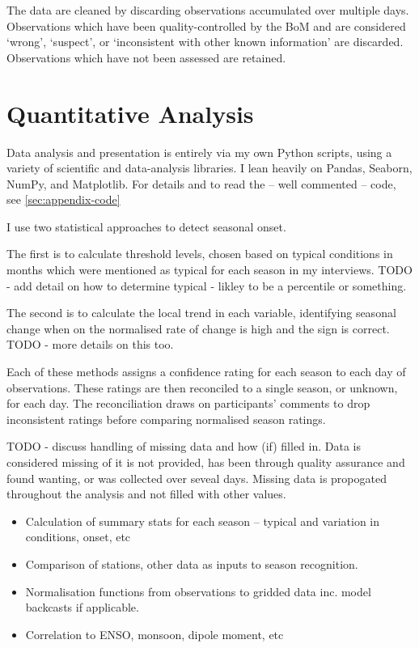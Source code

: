 The data are cleaned by discarding observations accumulated over multiple days.
Observations which have been quality-controlled by the BoM and are considered
`wrong', `suspect', or `inconsistent with other known information' are discarded.
Observations which have not been assessed are retained.



\section{Quantitative Analysis}

Data analysis and presentation is entirely via my own Python scripts,
using a variety of scientific and data-analysis libraries.
I lean heavily on Pandas, Seaborn, NumPy, and Matplotlib.
For details and to read the -- well commented -- code, see
\autoref{sec:appendix-code}


I use two statistical approaches to detect seasonal onset.

The first is to calculate threshold levels, chosen based on typical conditions
in months which were mentioned as typical for each season in my interviews.
TODO - add detail on how to determine typical - likley to be a percentile or something.

The second is to calculate the local trend in each variable, identifying seasonal
change when on the normalised rate of change is high and the sign is correct.
TODO - more details on this too.

Each of these methods assigns a confidence rating for each season to each day of
observations.  These ratings are then reconciled to a single season, or unknown,
for each day.  The reconciliation draws on participants' comments to drop inconsistent
ratings before comparing normalised season ratings.


TODO - discuss handling of missing data and how (if) filled in.
Data is considered missing of it is not provided, has been through
quality assurance and found wanting, or was collected over seveal days.
Missing data is propogated throughout the analysis and not filled with other values.



\begin{itemize}
\item Calculation of summary stats for each season – typical and variation in conditions, onset, etc
\item Comparison of stations, other data as inputs to season recognition.
\item Normalisation functions from observations to gridded data inc. model backcasts if applicable.
\item Correlation to ENSO, monsoon, dipole moment, etc
\end{itemize}

